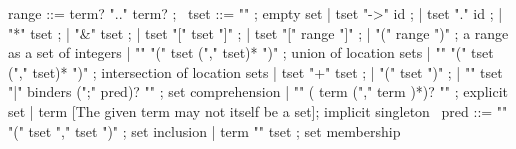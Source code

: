 \begin{syntax}
  range ::= term? ".." term? ;
       \
  tset ::= "\empty" ; empty set
       | tset "->" id ;
       | tset "." id ;
       | "*" tset ;
       | "&" tset ;
       | tset "[" tset "]" ;
       | tset "[" range "]" ;
       | "(" range ")" ; a range as a set of integers
       | "\union" "(" tset ("," tset)* ")" ; union of location sets
       | "\inter" "(" tset ("," tset)* ")" ; intersection of location sets
       | tset "+" tset ;
       | "(" tset ")" ;
       | "{" tset "|" binders (";" pred)? "}" ; set comprehension
       | { "{" ( term ("," term )*)? "}" } ; explicit set
       | term [The given term may not itself be a set]; implicit singleton
       \
  pred ::= "\subset" "(" tset "," tset ")" ; set inclusion
       | term "\in" tset ; set membership
\end{syntax}


